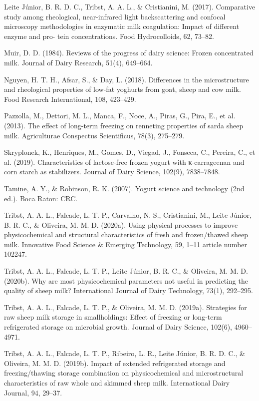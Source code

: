\documentclass[twocolumn]{ctexart}
\begin{document}
Leite Júnior, B. R. D. C., Tribst, A. A. L., \& Cristianini, M. (2017). Comparative study
among rheological, near-infrared light backscattering and confocal microscopy
methodologies in enzymatic milk coagulation: Impact of different enzyme and pro-
tein concentrations. Food Hydrocolloids, 62, 73–82.

Muir, D. D. (1984). Reviews of the progress of dairy science: Frozen concentrated milk.
Journal of Dairy Research, 51(4), 649–664.

Nguyen, H. T. H., Afsar, S., \& Day, L. (2018). Differences in the microstructure and
rheological properties of low-fat yoghurts from goat, sheep and cow milk. Food
Research International, 108, 423–429.

Pazzolla, M., Dettori, M. L., Manca, F., Noce, A., Piras, G., Pira, E., et al. (2013). The effect
of long-term freezing on renneting properties of sarda sheep milk. Agriculturae
Conspectus Scientificus, 78(3), 275–279.

Skryplonek, K., Henriques, M., Gomes, D., Viegad, J., Fonseca, C., Pereira, C., et al.
(2019). Characteristics of lactose-free frozen yogurt with κ-carrageenan and corn
starch as stabilizers. Journal of Dairy Science, 102(9), 7838–7848.

Tamine, A. Y., \& Robinson, R. K. (2007). Yogurt science and technology (2nd ed.). Boca
Raton: CRC.

Tribst, A. A. L., Falcade, L. T. P., Carvalho, N. S., Cristianini, M., Leite Júnior, B. R. C., \&
Oliveira, M. M. D. (2020a). Using physical processes to improve physicochemical and
structural characteristics of fresh and frozen/thawed sheep milk. Innovative Food
Science \& Emerging Technology, 59, 1–11 article number 102247.

Tribst, A. A. L., Falcade, L. T. P., Leite Júnior, B. R. C., \& Oliveira, M. M. D. (2020b). Why
are most physicochemical parameters not useful in predicting the quality of sheep
milk? International Journal of Dairy Technology, 73(1), 292–295.

Tribst, A. A. L., Falcade, L. T. P., \& Oliveira, M. M. D. (2019a). Strategies for raw sheep
milk storage in smallholdings: Effect of freezing or long-term refrigerated storage on
microbial growth. Journal of Dairy Science, 102(6), 4960–4971.

Tribst, A. A. L., Falcade, L. T. P., Ribeiro, L. R., Leite Júnior, B. R. D. C., \& Oliveira, M. M.
D. (2019b). Impact of extended refrigerated storage and freezing/thawing storage
combination on physicochemical and microstructural characteristics of raw whole
and skimmed sheep milk. International Dairy Journal, 94, 29–37.
\end{document}
